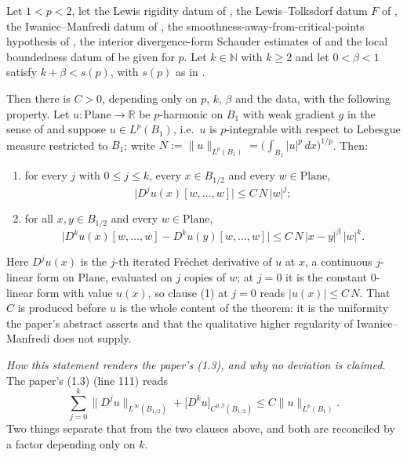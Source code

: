 \begin{theorem}
Let $1<p<2$, let the Lewis rigidity datum of , the Lewis--Tolksdorf
datum $F$ of , the Iwaniec--Manfredi datum of
, the smoothness-away-from-critical-points hypothesis of
, the interior divergence-form Schauder estimates of
 and the local boundedness datum of
 be given for $p$.  Let $k\in\mathbb{N}$ with $k\ge2$ and let
$0<\beta<1$ satisfy $k+\beta<s(p)$, with $s(p)$ as in .

Then there is $C>0$, depending only on $p$, $k$, $\beta$ and the data, with the following
property.  Let $u\colon\mathrm{Plane}\to\mathbb{R}$ be $p$-harmonic on $B_1$ with weak gradient
$g$ in the sense of  and suppose $u\in L^{p}(B_1)$, i.e.\ $u$ is
$p$-integrable with respect to Lebesgue measure restricted to $B_1$; write
$N:=\lVert u\rVert_{L^{p}(B_1)}=\bigl(\int_{B_1}\lvert u\rvert^{p}\,dx\bigr)^{1/p}$.  Then:
\begin{enumerate}
\item for every $j$ with $0\le j\le k$, every $x\in B_{1/2}$ and every $w\in\mathrm{Plane}$,
\[
  \bigl\lvert D^{j}u(x)[w,\ldots,w]\bigr\rvert\le C\,N\,\lvert w\rvert^{j};
\]
\item for all $x,y\in B_{1/2}$ and every $w\in\mathrm{Plane}$,
\[
  \bigl\lvert D^{k}u(x)[w,\ldots,w]-D^{k}u(y)[w,\ldots,w]\bigr\rvert
  \le C\,N\,\lvert x-y\rvert^{\beta}\,\lvert w\rvert^{k}.
\]
\end{enumerate}
Here $D^{j}u(x)$ is the $j$-th iterated Fr\'echet derivative of $u$ at $x$, a continuous
$j$-linear form on $\mathrm{Plane}$, evaluated on $j$ copies of $w$; at $j=0$ it is the
constant $0$-linear form with value $u(x)$, so clause (1) at $j=0$ reads
$\lvert u(x)\rvert\le C\,N$.  That $C$ is produced before $u$ is the whole content of the
theorem: it is the uniformity the paper's abstract asserts and that the qualitative higher
regularity of Iwaniec--Manfredi does not supply.

\medskip\noindent\emph{How this statement renders the paper's (1.3), and why no deviation is
claimed.}  The paper's (1.3) (line 111) reads
\[
  \sum_{j=0}^{k}\bigl\lVert D^{j}u\bigr\rVert_{L^{\infty}(B_{1/2})}
    +\bigl[D^{k}u\bigr]_{C^{0,\beta}(B_{1/2})}\le C\lVert u\rVert_{L^{p}(B_1)} .
\]
Two things separate that from the two clauses above, and both are reconciled by a factor
depending only on $k$.


\end{theorem}

